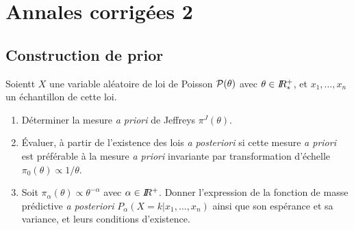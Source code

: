 \section{Annales corrigées 2}\label{annales2}


\subsection{Construction de prior}

Soientt $X$ une variable aléatoire de loi de Poisson ${\cal{P}}(\theta)$ avec $\theta\in I\!\!R^+_*$, et $x_1,\ldots,x_n$ un échantillon de cette loi.
\begin{enumerate}
\item Déterminer la mesure {\it a priori} de Jeffreys $\pi^J(\theta)$.
\item \'Evaluer, à partir de l'existence des lois {\it a posteriori} si cette mesure {\it a priori} est préférable à la mesure {\it a priori} invariante par transformation d'échelle $\pi_0(\theta)\propto1/\theta$.
\item Soit $\pi_{\alpha}(\theta) \propto \theta^{-\alpha}$ avec $\alpha\in I\!\!R^+$. Donner l'expression de la fonction de masse prédictive {\it a posteriori} $P_{\alpha}(X=k|x_1,\ldots,x_n)$ ainsi que son espérance et sa variance, et leurs conditions d'existence.
\end{enumerate}

